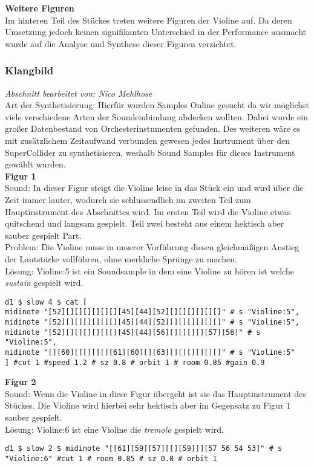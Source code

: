 \documentclass[
10pt, %
a4paper, %
oneside, %
headinclude,footinclude, %
BCOR5mm, %
]{scrartcl}
\begin{document}
\noindent\textbf{Weitere Figuren}\\
Im hinteren Teil des Stückes treten weitere Figuren der Violine auf. Da deren Umsetzung jedoch keinen signifikanten Unterschied in der Performance ausmacht wurde auf die Analyse und Synthese dieser Figuren verzichtet.

\subsubsection{Klangbild}
\textit{Abschnitt bearbeitet von: Nico Mehlhose}\\

\noindent 
Art der Synthetisierung: Hierfür wurden Samples Online gesucht da wir möglichst viele verschiedene Arten der Soundeinbindung abdecken wollten. Dabei wurde ein großer Datenbestand von Orchesterinstumenten gefunden.\cite{Orch} Des weiteren wäre es mit zusätzlichem Zeitaufwand verbunden gewesen jedes Instrument über den SuperCollider zu synthetisieren, weshalb Sound Samples für dieses Instrument gewählt wurden.\\

\noindent\textbf{Figur 1}\\
Sound: In dieser Figur steigt die Violine leise in das Stück ein und wird über die Zeit immer lauter, wodurch sie schlussendlich im zweiten Teil 
zum Hauptinstrument des Abschnittes wird. Im ersten Teil wird die Violine etwas quitschend und langsam gespielt. Teil zwei besteht aus einem hektisch aber sauber gespielt Part.\\
Problem: Die Violine muss in unserer Vorführung diesen gleichmäßigen Anstieg der Lautstärke vollführen, ohne merkliche Sprünge zu machen.\\
Lösung: Violine:5 ist ein Soundsample in dem eine Violine zu hören ist welche \textit{sustain} gespielt wird.
\begin{lstlisting}
d1 $ slow 4 $ cat [
midinote "[52][][][][][][][45][44][52][][][][][][]" # s "Violine:5",
midinote "[52][][][][][][][45][44][52][][][][][][]" # s "Violine:5",
midinote "[52][][][][][][][45][44][56][][][][][57][56]" # s "Violine:5",
midinote "[][60][][][][][61][60][][63][][][][][][]" # s "Violine:5"
] #cut 1 #speed 1.2 # sz 0.8 # orbit 1 # room 0.85 #gain 0.9
\end{lstlisting}
\noindent\textbf{Figur 2}\\
Sound: Wenn die Violine in diese Figur übergeht ist sie das Hauptinstrument des Stückes. Die Violine wird hierbei sehr hektisch aber im Gegensatz zu Figur 1 sauber gespielt.\\
Lösung: Violine:6 ist eine Violine die \textit{tremolo} gespielt wird.
\begin{lstlisting}
d1 $ slow 2 $ midinote "[[61][59][57][[][59]]][57 56 54 53]" # s "Violine:6" #cut 1 # room 0.85 # sz 0.8 # orbit 1
\end{lstlisting}
\end{document}
